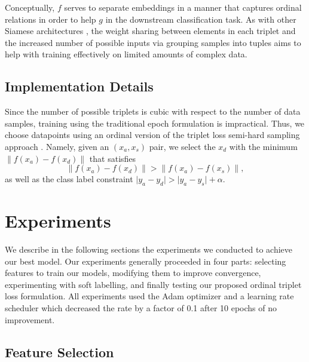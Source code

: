 Conceptually, $f$ serves to separate embeddings in a manner that captures ordinal relations %
in order to help $g$ in the downstream classification task.
As with other Siamese architectures \cite{koch2015siamese},
the weight sharing between elements in each triplet and the increased number of possible inputs via grouping samples into tuples aims to help with training effectively on limited amounts of complex data.

\subsection{Implementation Details}

Since the number of possible triplets is cubic with respect to the number of data samples, training using the traditional epoch formulation is impractical. Thus, %
we choose datapoints using an ordinal version of the triplet loss semi-hard sampling approach \cite{schroff2015facenet}.
Namely, given an $(x_a, x_s)$ pair, we select the $x_d$ with the minimum $\lVert f(x_a)-f(x_d) \rVert$ that satisfies $$\lVert f(x_a)-f(x_d) \rVert > \lVert f(x_a)-f(x_s) \rVert,$$ as well as the class label constraint $\lvert y_a-y_d \rvert > \lvert y_a-y_s \rvert+\alpha$.


\section{Experiments}

We describe in the following sections the experiments we conducted to achieve our best model. Our experiments generally proceeded in four parts: selecting features to train our models, modifying them to improve convergence, experimenting with soft labelling, and finally testing our proposed ordinal triplet loss formulation.
All experiments used the Adam optimizer and a learning rate scheduler which decreased the rate by a factor of 0.1 after 10 epochs of no improvement.

\subsection{Feature Selection}

